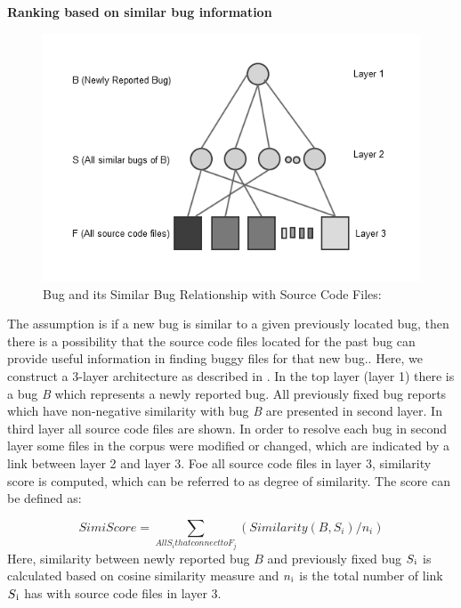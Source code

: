 \documentclass[conference]{IEEEtran}
\begin{document}
\textbf{Ranking based on similar bug information}
\begin{figure}
	\centering
	\includegraphics[scale=0.48]{3layers-Gray}
	\caption{Bug and its Similar Bug Relationship with Source Code Files:}
	\label{fig:BSBR}
\end{figure}
The assumption is if a new bug is similar to a given previously located bug, then there is a possibility that the source code files located for the past bug can provide useful information in finding buggy files for that new bug.. Here, we construct a 3-layer architecture as described in \cite{Jian}. In the top layer (layer 1) there is a bug \textit{B} which represents a newly reported bug. All previously fixed bug reports which have non-negative similarity with bug  \textit{B} are presented in second layer. In third layer all source code files are shown. In order to resolve each bug in second layer some files in the corpus were modified or changed, which are indicated by a link between layer 2 and layer 3. Foe all source code files in layer 3, similarity score is computed, which can be referred to as degree of similarity. The score can be defined as:

\begin{equation}\label{Simiequation}
SimiScore=\sum_{All S_{i} that connect to F_{j}}(Similarity(B,S_{i})/n_{i})
\end{equation} 
Here, similarity between newly reported bug {$B$} and previously fixed bug {$S\textsubscript{i}$} is calculated based on cosine similarity measure and {$n\textsubscript{i}$} is the total number of link {$S\textsubscript{i}$} has with source code files in layer 3.
\end{document}
